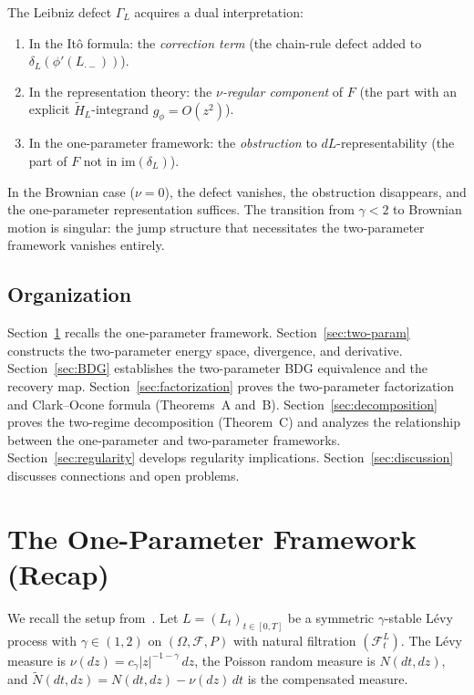 \documentclass[11pt,a4paper]{article}
\theoremstyle{plain}
\theoremstyle{definition}
\theoremstyle{remark}
\newcommand{\im}{\mathrm{im}}
\begin{document}
The Leibniz defect $\Gamma_L$ acquires a dual interpretation:
\begin{enumerate}[label=(\roman*)]
\item In the It\^o formula: the \emph{correction term}
  (the chain-rule defect added to $\delta_L(\phi'(L_{\cdot-}))$).
\item In the representation theory: the \emph{$\nu$-regular
  component} of $F$ (the part with an explicit
  $\widetilde{H}_L$-integrand $g_\phi = O(z^2)$).
\item In the one-parameter framework: the \emph{obstruction}
  to $dL$-representability (the part of $F$ not in
  $\im(\delta_L)$).
\end{enumerate}
In the Brownian case ($\nu = 0$), the defect vanishes,
the obstruction disappears, and the one-parameter
representation suffices.  The transition from
$\gamma < 2$ to Brownian motion is singular:
the jump structure that necessitates the two-parameter
framework vanishes entirely.


\subsection{Organization}

Section~\ref{sec:one-param-recap} recalls the one-parameter
framework.  Section~\ref{sec:two-param} constructs the
two-parameter energy space, divergence, and derivative.
Section~\ref{sec:BDG} establishes the two-parameter BDG
equivalence and the recovery map.
Section~\ref{sec:factorization} proves the two-parameter
factorization and Clark--Ocone formula (Theorems~A and~B).
Section~\ref{sec:decomposition} proves the two-regime
decomposition (Theorem~C) and analyzes the relationship
between the one-parameter and two-parameter frameworks.
Section~\ref{sec:regularity} develops regularity implications.
Section~\ref{sec:discussion} discusses connections and open
problems.


\section{The One-Parameter Framework (Recap)}
\label{sec:one-param-recap}

We recall the setup from~\cite{Fontes2026d,Fontes2026f}.
Let $L = (L_t)_{t \in [0,T]}$ be a symmetric $\gamma$-stable
L\'evy process with $\gamma \in (1,2)$ on
$(\Omega, \mathcal{F}, P)$ with natural filtration
$(\mathcal{F}_t^L)$.  The L\'evy measure is
$\nu(dz) = c_\gamma|z|^{-1-\gamma}\,dz$, the Poisson random
measure is $N(dt,dz)$, and $\widetilde{N}(dt,dz) =
N(dt,dz) - \nu(dz)\,dt$ is the compensated measure.
\end{document}
